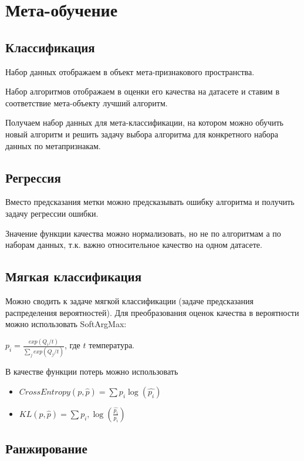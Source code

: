 \section{Мета-обучение}

\subsection*{Классификация}

Набор данных отображаем в объект мета-признакового пространства.

Набор алгоритмов отображаем в оценки его качества на датасете
и ставим в соответствие мета-объекту лучший алгоритм.

Получаем набор данных для мета-классификации, на котором можно
обучить новый алгоритм и решить задачу выбора алгоритма для
конкретного набора данных по метапризнакам.

\subsection*{Регрессия}

Вместо предсказания метки можно предсказывать ошибку алгоритма и
получить задачу регрессии ошибки.

Значение функции качества можно нормализовать, но не по алгоритмам
а по наборам данных, т.к. важно относительное качество на одном
датасете.

\subsection*{Мягкая классификация}

Можно сводить к задаче мягкой классификации (задаче
предсказания распределения вероятностей). Для преобразования
оценок качества в вероятности можно использовать SoftArgMax:

$p_i = \frac{exp(Q_i / t)}{\sum_j exp(Q_j / t)}$,
где $t$ температура.

В качестве функции потерь можно использовать
\begin{itemize}
    \item $CrossEntropy(p, \hat{p}) = \sum p_i \log (\hat{p_i})$
    \item $KL(p, \hat{p}) = \sum p_i, \log(\frac{\hat{p_i}}{p_i})$
\end{itemize}

\subsection*{Ранжирование}

